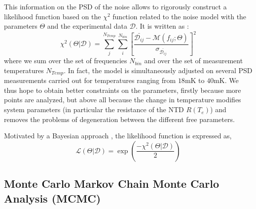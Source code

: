 This information on the PSD of the noise allows to rigorously construct a likelihood function based on the $\chi^2$ function related to the noise model with the parameters $\Theta$ and the experimental data $\mathcal{D}$. It is written as :
\begin{equation}
\label{chi2}
\chi ^2 (\Theta|\mathcal{D}) = \sum^{N_{Temp}}_{j} \sum^{N_{bin}}_{i} \left[ \frac{\bar{\mathcal{D}_{ij}} - \mathcal{M}(f_{ij}; \Theta)}{\sigma_{\bar{\mathcal{D}_{ij}}}} \right]^2
\end{equation}
where we sum over the set of frequencies $N_{bin}$ and over the set of measurement temperatures $N_{Temp}$. In fact, the model is simultaneously adjusted on several PSD measurements carried out for temperatures ranging from $18$mK to $40$mK. We thus hope to obtain better constraints on the parameters, firstly because more points are analyzed, but above all because the change in temperature modifies system parameters (in particular the resistance of the NTD $R(T_e)$) and removes the problems of degeneration between the different free parameters.

Motivated by a Bayesian approach \cite{julian}, the likelihood function is expressed as,
\begin{equation}
\label{likelihood}
\mathcal{L}(\Theta | \mathcal{D}) = \exp{\left(\frac{-\chi ^2 (\Theta|\mathcal{D})}{2}\right)}
\end{equation}

\subsection{Monte Carlo Markov Chain Monte Carlo Analysis (MCMC)}


